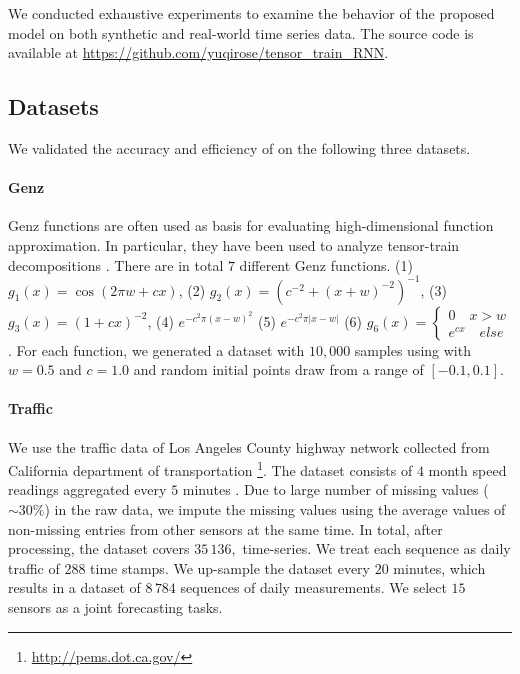 We conducted  exhaustive experiments to examine the behavior of the proposed \trnn{} model on both synthetic and real-world time series data. The source code is available at \url{https://github.com/yuqirose/tensor_train_RNN}.
 
\subsection{Datasets}
% 
We validated the accuracy and efficiency of \trnn{} on the following three datasets. 
\paragraph{Genz}
Genz functions are often used as  basis for evaluating high-dimensional function approximation. In particular, they have been used to analyze tensor-train decompositions \citep{bigoni2016spectral}. There are in total $7$ different Genz functions. (1) $g_1 (x) = \cos( 2 \pi w + cx)$, (2) $g_2 (x) =( c^{-2} + (x+w)^{-2})^{-1}$, (3) $g_3(x) = (1+cx)^{-2}$, (4) $e^{- c^2\pi (x-w)^2}$ (5)  $e^{-c^2 \pi | x-w|}$ (6) $g_6(x) = \begin{cases} 0  \quad x>w\\ e^{cx} \quad  else \end{cases}$.  For each function, we generated a dataset with $10,000$ samples using  with $w=0.5$ and $c=1.0$ and random initial points draw from a range of $[-0.1, 0.1]$. 


\paragraph{Traffic}
%
We use the traffic data of Los Angeles County highway network collected from  California department of transportation \footnote{\url{http://pems.dot.ca.gov/}}. The dataset consists of $4$ month speed readings aggregated every $5$ minutes . Due to large number of missing values ($\sim 30\%$) in the raw data, we  impute the missing values using the average values of non-missing entries from other sensors at the same time. In total, after processing, the dataset covers $35\,136,$ time-series. We treat each sequence as daily traffic of $288$ time stamps. We up-sample the dataset every $20$ minutes, which results in a dataset of $8\,784$ sequences of daily measurements. We select $15$ sensors as a joint forecasting tasks.

